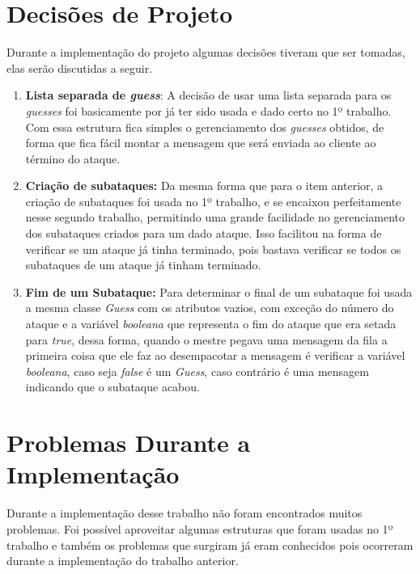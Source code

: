 \documentclass[
	12pt,				%
    oneside,			%
	a4paper,			%
	english,			%
	brazil,				%
	]{abntex2}
\begin{document}
\section{Decisões de Projeto}
Durante a implementação do projeto algumas decisões tiveram que ser tomadas, elas serão discutidas a seguir.

\begin{enumerate}

	\item \textbf{Lista separada de \textit{guess}}: A decisão de usar uma lista separada para os \textit{guesses} foi 
	basicamente por já ter sido usada e dado certo no 1º trabalho. Com essa estrutura fica simples o gerenciamento dos 
	\textit{guesses} obtidos, de forma que fica fácil montar a mensagem que será enviada ao cliente ao término do ataque.
	
	\item \textbf{Criação de subataques:} Da mesma forma que para o item anterior, a criação de subataques foi usada no 1º 	
	trabalho, e se encaixou perfeitamente nesse segundo trabalho, permitindo uma grande facilidade no gerenciamento dos 
	subataques criados para um dado ataque. Isso facilitou na forma de verificar se um ataque já tinha terminado, pois 
	bastava verificar se todos os subataques de um ataque já tinham terminado.
		
	\item \textbf{Fim de um Subataque:}  Para determinar o final de um subataque foi usada a mesma classe \textit{Guess}
	com os atributos vazios, com exceção do número do ataque e a variável \textit{booleana} que representa o fim do ataque 		que era setada para \textit{true}, dessa forma, quando o mestre pegava uma mensagem da fila a primeira coisa que ele faz 
	ao desempacotar a mensagem é verificar a variável \textit{booleana}, caso seja \textit{false} é um \textit{Guess}, 
	caso contrário é uma mensagem indicando que o subataque acabou.
	
\end{enumerate}

\section{Problemas Durante a Implementação}
Durante a implementação desse trabalho não foram encontrados muitos problemas. Foi possível aproveitar algumas estruturas que foram usadas no 1º trabalho e também os problemas que surgiram já eram conhecidos pois ocorreram durante a implementação do trabalho anterior.
\end{document}
